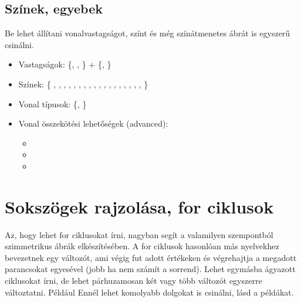 \subsection{Színek, egyebek}

Be lehet állítani vonalvastagságot, színt és még színátmenetes ábrát is egyszerű csinálni.
\begin{itemize}
    \item Vastagságok: \{, , \} + \{, \}
    \item Színek: \{ , , , , , , , , , , , , , , , , , ,  \}
    \item Vonal típusok: \{, \}
    \item Vonal összekötési lehetőségek (advanced): \begin{itemize}
        \item {}
        \item {}
        \item {}
        \end{itemize}
\end{itemize}

\begin{tikzExample}
\end{tikzExample}

\section{Sokszögek rajzolása, for ciklusok}

Az, hogy lehet for ciklusokat írni, nagyban segít a valamilyen szempontból szimmetrikus ábrák elkészítésében. A for ciklusok hasonlóan más nyelvekhez bevezetnek egy változót, ami végig fut adott értékeken és végrehajtja a megadott parancsokat egyesével (jobb ha nem számít a sorrend).  Lehet egymásba ágyazott ciklusokat írni, de lehet párhuzamosan két vagy több változót egyszerre változtatni. Például  Ennél lehet komolyabb dolgokat is csinálni, lásd a példákat.

